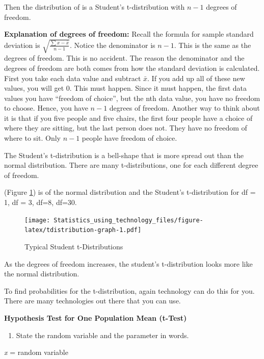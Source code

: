 \documentclass[
]{book}
\providecommand{\tightlist}{%
  \setlength{\itemsep}{0pt}\setlength{\parskip}{0pt}}
\begin{document}
Then the distribution of is a Student's t-distribution with \(n-1\) degrees of freedom.

\textbf{Explanation of degrees of freedom:} Recall the formula for sample standard deviation is \(\sqrt{{\frac{\sum{x-\bar{x}}}{n-1}}}\). Notice the denominator is \(n-1\). This is the same as the degrees of freedom. This is no accident. The reason the denominator and the degrees of freedom are both comes from how the standard deviation is calculated. First you take each data value and subtract \(\bar{x}\). If you add up all of these new values, you will get 0. This must happen. Since it must happen, the first data values you have ``freedom of choice'', but the nth data value, you have no freedom to choose. Hence, you have \(n-1\) degrees of freedom. Another way to think about it is that if you five people and five chairs, the first four people have a choice of where they are sitting, but the last person does not. They have no freedom of where to sit. Only \(n-1\) people have freedom of choice.

The Student's t-distribution is a bell-shape that is more spread out than the normal distribution. There are many t-distributions, one for each different degree of freedom.

(Figure \ref{fig:tdistribution-graph}) is of the normal distribution and the Student's t-distribution for df = 1, df = 3, df=8, df=30.



\begin{figure}
\centering
\texttt{[image: Statistics\_using\_technology\_files/figure-latex/tdistribution-graph-1.pdf]}
\caption{\label{fig:tdistribution-graph}Typical Student t-Distributions}
\end{figure}

As the degrees of freedom increases, the student's t-distribution looks
more like the normal distribution.

To find probabilities for the t-distribution, again technology can do this for you. There are many technologies out there that you can use.

\textbf{Hypothesis Test for One Population Mean (t-Test)}

\begin{enumerate}
\def\labelenumi{\arabic{enumi}.}
\tightlist
\item
  State the random variable and the parameter in words.
\end{enumerate}

\emph{x} = random variable
\end{document}
